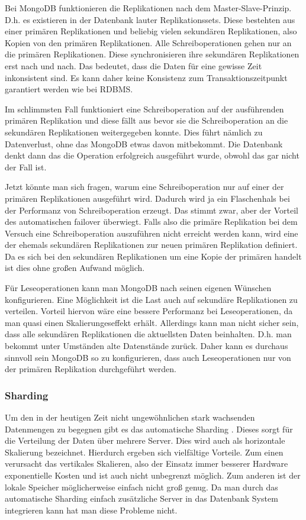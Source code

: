 Bei MongoDB funktionieren die Replikationen nach dem Master-Slave-Prinzip. \cite{mongodb:replication}
D.h. es existieren in der Datenbank lauter Replikationssets. Diese bestehten
aus einer primären Replikationen und beliebig vielen sekundären Replikationen, also Kopien von den
primären Replikationen. Alle Schreiboperationen gehen nur an die primären Replikationen. Diese synchronisieren ihre sekundären
Replikationen erst nach und nach. Das bedeutet, dass die Daten für eine gewisse Zeit
inkonsistent sind. Es kann daher keine Konsistenz zum Transaktionszeitpunkt garantiert werden wie bei RDBMS.

Im schlimmsten Fall funktioniert eine Schreiboperation auf der ausführenden primären Replikation und
diese fällt aus bevor sie die Schreiboperation an die sekundären Replikationen
weitergegeben konnte. Dies führt nämlich zu Datenverlust, ohne das MongoDB
etwas davon mitbekommt. Die Datenbank denkt dann das die Operation
erfolgreich ausgeführt wurde, obwohl das gar nicht der Fall ist.

Jetzt könnte man sich fragen, warum eine Schreiboperation nur auf einer der primären Replikationen ausgeführt wird.
Dadurch wird ja ein Flaschenhals bei der Performanz von Schreiboperation erzeugt.
Das stimmt zwar, aber der Vorteil des automatischen failover überwiegt. Falls also
die primäre Replikation bei dem Versuch eine Schreiboperation auszuführen nicht erreicht werden kann,
wird eine der ehemals sekundären Replikationen zur neuen primären Replikation definiert. Da es sich bei den sekundären Replikationen
um eine Kopie der primären handelt ist dies ohne großen Aufwand möglich.

Für Leseoperationen kann man MongoDB nach seinen eigenen Wünschen konfigurieren. \cite{mongodb:replication}
Eine Möglichkeit ist die Last auch auf sekundäre Replikationen zu verteilen.
Vorteil hiervon wäre eine bessere Performanz bei Leseoperationen, da man quasi einen
Skalierungeseffekt erhält. Allerdings kann man nicht sicher
sein, dass alle sekundären Replikationen die aktuellsten Daten beinhalten.
D.h. man bekommt unter Umständen alte Datenstände zurück. Daher kann es durchaus sinnvoll sein
MongoDB so zu konfigurieren, dass auch Leseoperationen nur von der primären Replikation durchgeführt werden.

\subsubsection{Sharding}
Um den in der heutigen Zeit nicht ungewöhnlichen stark wachsenden Datenmengen
zu begegnen gibt es das automatische Sharding \cite{mongodb:sharding}. Dieses sorgt für die
Verteilung der Daten über mehrere Server. Dies wird auch als
horizontale Skalierung bezeichnet. Hierdurch ergeben sich vielfältige Vorteile. Zum
einen verursacht das vertikales Skalieren, also der Einsatz immer
besserer Hardware exponentielle Kosten und ist auch nicht unbegrenzt möglich. Zum anderen ist der lokale
Speicher möglicherweise einfach nicht groß genug. Da man durch das automatische Sharding einfach zusätzliche Server
in das Datenbank System integrieren kann hat man diese Probleme nicht.

